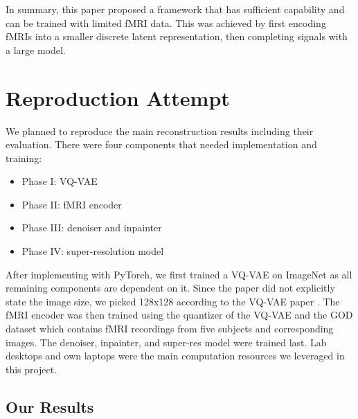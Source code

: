 \documentclass{article}
\theoremstyle{plain}
\theoremstyle{definition}
\theoremstyle{remark}
\begin{document}
In summary, this paper proposed a framework that has sufficient capability and can be trained with limited fMRI data. This was achieved by first encoding fMRIs into a smaller discrete latent representation, then completing signals with a large model.


\section{Reproduction Attempt}

We planned to reproduce the main reconstruction results including their evaluation. There were four components that needed implementation and training:
\begin{itemize}
\item Phase I: VQ-VAE
\item Phase II: fMRI encoder
\item Phase III: denoiser and inpainter
\item Phase IV: super-resolution model
\end{itemize} 

After implementing with PyTorch, we first trained a VQ-VAE on ImageNet as all remaining components are dependent on it. Since the paper did not explicitly state the image size, we picked 128x128 according to the VQ-VAE paper \cite{oordNeuralDiscreteRepresentation2018}. The fMRI encoder was then trained using the quantizer of the VQ-VAE and the GOD dataset \citep{horikawa2016} which contains fMRI recordings from five subjects and corresponding images. The denoiser, inpainter, and super-res model were trained last. Lab desktops and own laptops were the main computation resources we leveraged in this project.

\subsection{Our Results}
\end{document}
